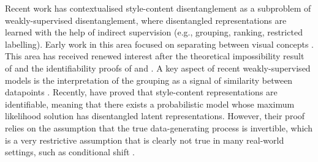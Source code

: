 \documentclass[../thesis.tex]{subfiles}
\begin{document}
Recent work \citep{shuWeaklySupervisedDisentanglement2019, locatelloWeaklySupervisedDisentanglementCompromises2020} has contextualised style-content disentanglement as a subproblem of weakly-supervised disentanglement, where disentangled representations are learned with the help of indirect supervision (e.g., grouping, ranking, restricted labelling). Early work in this area focused on separating between visual concepts \citep{reedDeepVisualAnalogyMaking2015,kulkarniDeepConvolutionalInverse2015}. This area has received renewed interest after the theoretical impossibility result of \citet{locatelloChallengingCommonAssumptions2019} and the identifiability proofs of \citet{khemakhemVariationalAutoencodersNonlinear2020} and \citet{mitaIdentifiableDoubleVAE2021}. A key aspect of recent weakly-supervised models is the interpretation of the grouping as a signal of similarity between datapoints \citep{chenWeaklySupervisedDisentanglement2020}. Recently, \citep{vonkugelgenSelfSupervisedLearningData2021} have proved that style-content representations are identifiable, meaning that there exists a probabilistic model whose maximum likelihood solution has disentangled latent representations. However, their proof relies on the assumption that the true data-generating process is invertible, which is a very restrictive assumption that is clearly not true in many real-world settings, such as conditional shift \citep{zhangDomainAdaptationTarget2013}.  

\end{document}
